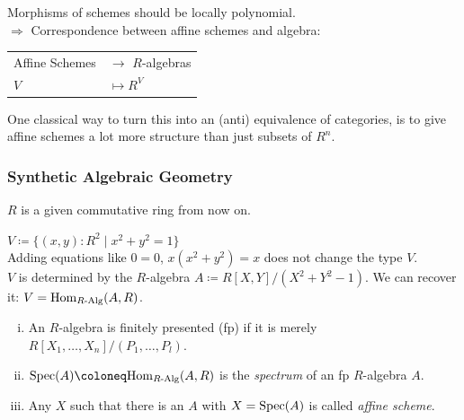 \documentclass{beamer}
\begin{document}
\begin{frame}
    
  Morphisms of schemes should be locally polynomial. \\
  \pause
  $\Rightarrow$ Correspondence between affine schemes and algebra: \\
  \pause
  \begin{center}
    \begin{tabular}{ll}
      Affine Schemes & $\to$ $R$-algebras \\
      $V$ & $\mapsto R^V$
    \end{tabular}
  \end{center}
  \pause
  One classical way to turn this into an (anti) equivalence of categories,
  is to give affine schemes a lot more structure than just subsets of $R^n$.
\end{frame}

\begin{frame}
  \frametitle{\textbf{Synthetic Algebraic Geometry}}
  \pause
  $R$ is a given commutative ring from now on. \\
  \vspace{0.4cm}
  \pause

  $V\coloneq \{(x,y):R^2\mid x^2+y^2=1 \}$ \\

  \pause
  Adding equations like $0=0$, $x(x^2+y^2)=x$ does not change the type $V$. \\
  \pause
  $V$ is determined by the $R$-algebra $A\coloneq R[X,Y]/(X^2+Y^2-1)$.
  \pause
  We can recover it: $V=\mathrm{Hom}_{R\text{-}\mathrm{Alg}}(A,R)$. \\
  \vspace{0.4cm}
  \pause
  \begin{definition}
    \begin{enumerate}[(i)]
    \item An $R$-algebra is finitely presented (fp) if it is merely $R[X_1,\dots,X_n]/(P_1,\dots,P_l)$.
    \item $\Spec(A)\coloneq \Hom_{\Alg{R}}(A,R)$ is the \emph{spectrum} of an fp $R$-algebra $A$.
    \item Any $X$ such that there is an $A$ with $X=\operatorname{Spec}(A)$ is called \emph{affine scheme}.
    \end{enumerate}
  \end{definition}
\end{frame}
\end{document}
